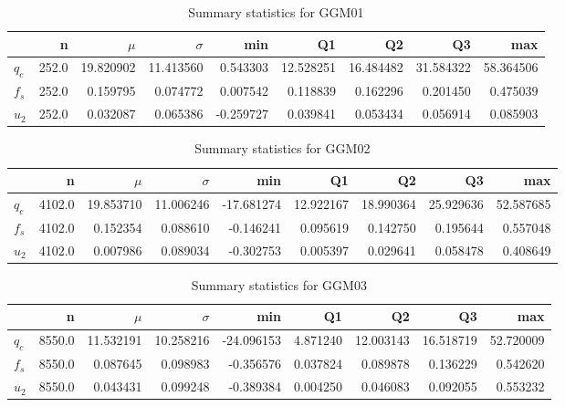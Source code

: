 \begin{table}[h]
\caption{Summary statistics for GGM01}
\begin{tabular}{lrrrrrrrr}
\toprule
{} &      n &      $\mu$ &   $\sigma$ &       min &         Q1 &         Q2 &         Q3 &        max \\
\midrule
$q_c$ &  252.0 &  19.820902 &  11.413560 &  0.543303 &  12.528251 &  16.484482 &  31.584322 &  58.364506 \\
$f_s$ &  252.0 &   0.159795 &   0.074772 &  0.007542 &   0.118839 &   0.162296 &   0.201450 &   0.475039 \\
$u_2$ &  252.0 &   0.032087 &   0.065386 & -0.259727 &   0.039841 &   0.053434 &   0.056914 &   0.085903 \\
\bottomrule
\end{tabular}
\end{table}

\begin{table}[h]
\caption{Summary statistics for GGM02}
\begin{tabular}{lrrrrrrrr}
\toprule
{} &       n &      $\mu$ &   $\sigma$ &        min &         Q1 &         Q2 &         Q3 &        max \\
\midrule
$q_c$ &  4102.0 &  19.853710 &  11.006246 & -17.681274 &  12.922167 &  18.990364 &  25.929636 &  52.587685 \\
$f_s$ &  4102.0 &   0.152354 &   0.088610 &  -0.146241 &   0.095619 &   0.142750 &   0.195644 &   0.557048 \\
$u_2$ &  4102.0 &   0.007986 &   0.089034 &  -0.302753 &   0.005397 &   0.029641 &   0.058478 &   0.408649 \\
\bottomrule
\end{tabular}
\end{table}

\begin{table}[h]
\caption{Summary statistics for GGM03}
\begin{tabular}{lrrrrrrrr}
\toprule
{} &       n &      $\mu$ &   $\sigma$ &        min &        Q1 &         Q2 &         Q3 &        max \\
\midrule
$q_c$ &  8550.0 &  11.532191 &  10.258216 & -24.096153 &  4.871240 &  12.003143 &  16.518719 &  52.720009 \\
$f_s$ &  8550.0 &   0.087645 &   0.098983 &  -0.356576 &  0.037824 &   0.089878 &   0.136229 &   0.542620 \\
$u_2$ &  8550.0 &   0.043431 &   0.099248 &  -0.389384 &  0.004250 &   0.046083 &   0.092055 &   0.553232 \\
\bottomrule
\end{tabular}
\end{table}

